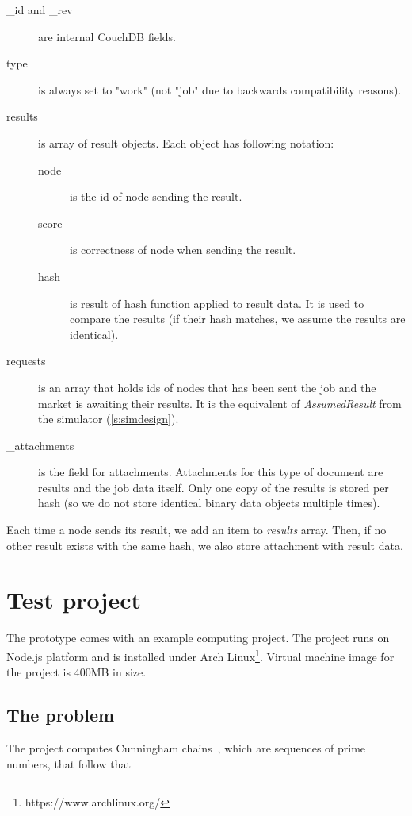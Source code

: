 \begin{description}
\item[\_id and \_rev] are internal CouchDB fields.
\item[type] is always set to "work" (not "job" due to backwards compatibility reasons).
\item[results] is array of result objects. Each object has following notation:
  \begin{description}
  \item[node] is the id of node sending the result.
  \item[score] is correctness of node when sending the result.
  \item[hash] is result of hash function applied to result data. It is used to compare the results (if their hash matches, we assume the results are identical).
  \end{description}
 \item[requests] is an array that holds ids of nodes that has been sent the job and the market is awaiting their results. It is the equivalent of \emph{AssumedResult} from the simulator (\ref{s:simdesign}).
 \item[\_attachments] is the field for attachments. Attachments for this type of document are results and the job data itself. Only one copy of the results is stored per hash (so we do not store identical binary data objects multiple times).
\end{description}

Each time a node sends its result, we add an item to \emph{results} array. Then, if no other result exists with the same hash, we also store attachment with result data.

\section{Test project}

The prototype comes with an example computing project. The project runs on Node.js platform and is installed under Arch Linux\footnote{https://www.archlinux.org/}. Virtual machine image for the project is 400MB in size.

\subsection{The problem}

The project computes Cunningham chains~\cite{andersen2005cunningham}, which are sequences of prime numbers, that follow that

